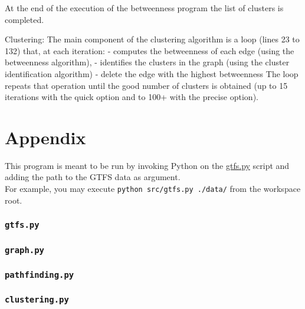 \documentclass[12pt,english]{article}
\makeatletter
\let\old@appendix\appendix
\renewcommand*\appendix{
		\newpage
		\part*{Appendix}\addcontentsline{toc}{part}{Appendix}
		\old@appendix%
	}
\makeatother
\begin{document}
	At the end of the execution of the betweenness program the list of clusters is completed.


	Clustering:
	The main component of the clustering algorithm is a loop (lines 23 to 132) that, at each iteration:
	- computes the betweenness of each edge (using the betweenness algorithm),
	- identifies the clusters in the graph (using the cluster identification algorithm)
	- delete the edge with the highest betweenness
	The loop repeats that operation until the good number of clusters is obtained
	(up to 15 iterations with the quick option and to 100+ with the precise option).




	\appendix

	This program is meant to be run by invoking Python on the \hyperref[sec:code:gtfs]{\ttfamily gtfs.py} script and adding the path to the GTFS data as argument.\\
	For example, you may execute \texttt{python src/gtfs.py ./data/} from the workspace root.

	\section{\texttt{gtfs.py}}\label{sec:code:gtfs}
	

	\section{\texttt{graph.py}}\label{sec:code:graph}
	

	\section{\texttt{pathfinding.py}}\label{sec:code:pathfinding}
	

	\section{\texttt{clustering.py}}\label{sec:code:clustering}
	
\end{document}
